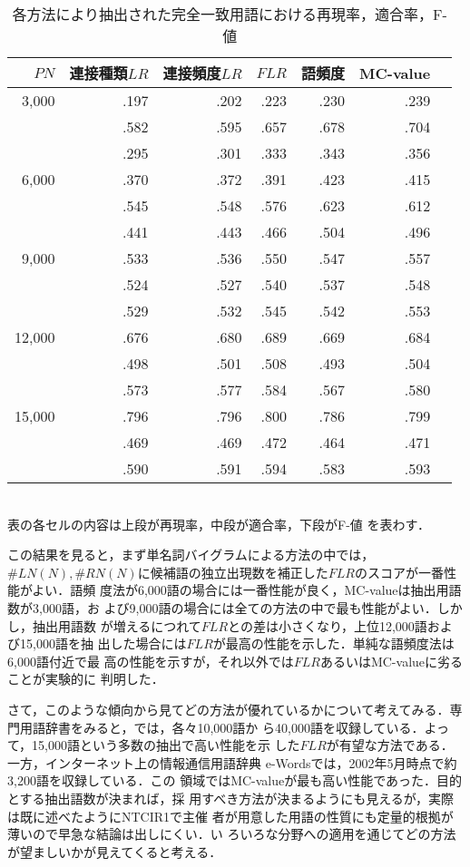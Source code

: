 \begin{table}[htbp]
\caption{各方法により抽出された完全一致用語における再現率，適合率，F-値}\label{table2}
\begin{center}
\begin{tabular}{|r|r|r|r|r|r|r|}
\hline
$PN$   &  連接種類$LR$ & 連接頻度$LR$ & $FLR$   & 語頻度 & MC-value  \\ \hline
3,000  & .197 & .202 & .223 & .230 & .239 \\
       & .582 & .595 & .657 & .678 & .704 \\
       & .295 & .301 & .333 & .343 & .356 \\ \hline
6,000  & .370 & .372 & .391 & .423 & .415 \\
       & .545 & .548 & .576 & .623 & .612 \\
       & .441 & .443 & .466 & .504 & .496 \\ \hline
9,000  & .533 & .536 & .550 & .547 & .557 \\
       & .524 & .527 & .540 & .537 & .548 \\
       & .529 & .532 & .545 & .542 & .553 \\ \hline
12,000 & .676 & .680 & .689 & .669 & .684 \\
       & .498 & .501 & .508 & .493 & .504 \\
       & .573 & .577 & .584 & .567 & .580 \\ \hline
15,000 & .796 & .796 & .800 & .786 & .799 \\
       & .469 & .469 & .472 & .464 & .471 \\
       & .590 & .591 & .594 & .583 & .593 \\ \hline
\end{tabular}\\
表の各セルの内容は上段が再現率，中段が適合率，下段がF-値 を表わす．
\end{center}
\end{table}

この結果を見ると，まず単名詞バイグラムによる方法の中では，$\#LN(N),
\#RN(N)$に候補語の独立出現数を補正した$FLR$のスコアが一番性能がよい．語頻
度法が6,000語の場合には一番性能が良く，MC-valueは抽出用語数が3,000語，お
よび9,000語の場合には全ての方法の中で最も性能がよい．しかし，抽出用語数
が増えるにつれて$FLR$との差は小さくなり，上位12,000語および15,000語を抽
出した場合には$FLR$が最高の性能を示した．単純な語頻度法は6,000語付近で最
高の性能を示すが，それ以外では$FLR$あるいはMC-valueに劣ることが実験的に
判明した．

さて，このような傾向から見てどの方法が優れているかについて考えてみる．専
門用語辞書をみると，\cite{densi,computer-sci,archi}では，各々10,000語か
ら40,000語を収録している．よって，15,000語という多数の抽出で高い性能を示
した$FLR$が有望な方法である．一方，インターネット上の情報通信用語辞典
e-Words\cite{e-words}では，2002年5月時点で約3,200語を収録している．この
領域ではMC-valueが最も高い性能であった．目的とする抽出語数が決まれば，採
用すべき方法が決まるようにも見えるが，実際は既に述べたようにNTCIR1で主催
者が用意した用語の性質にも定量的根拠が薄いので早急な結論は出しにくい．い
ろいろな分野への適用を通じてどの方法が望ましいかが見えてくると考える．

